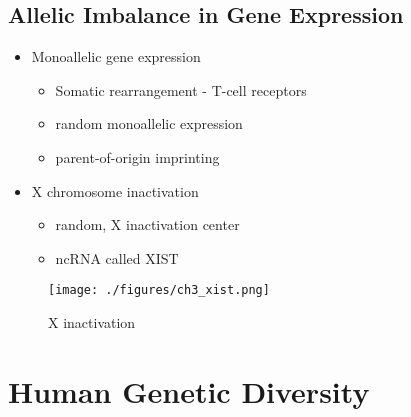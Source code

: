 \documentclass[12pt]{scrartcl}
\begin{document}
\subsection{Allelic Imbalance in Gene Expression}
\label{sec:org33c18c8}
\begin{itemize}
\item Monoallelic gene expression
\begin{itemize}
\item Somatic rearrangement - T-cell receptors
\item random monoallelic expression
\item parent-of-origin imprinting
\end{itemize}
\item X chromosome inactivation
\begin{itemize}
\item random, X inactivation center
\item ncRNA called XIST
\end{itemize}
\end{itemize}

\begin{figure}[htbp]
\centering
\texttt{[image: ./figures/ch3\_xist.png]}
\caption{\label{fig:org2369670}X inactivation}
\end{figure}

\section{Human Genetic Diversity}
\label{sec:org0b096b0}
\end{document}
